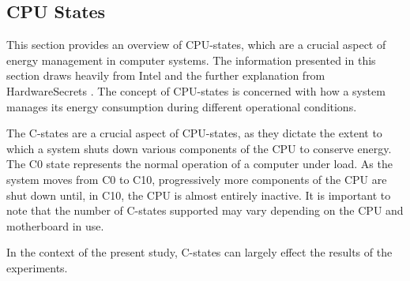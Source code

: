 \subsection{CPU States}\label{subsec:cpustates}

This section provides an overview of CPU-states, which are a crucial aspect of energy management in computer systems. The information presented in this section draws heavily from Intel \cite{CIntel} and the further explanation from HardwareSecrets \cite{CHard}. The concept of CPU-states is concerned with how a system manages its energy consumption during different operational conditions.

The C-states are a crucial aspect of CPU-states, as they dictate the extent to which a system shuts down various components of the CPU to conserve energy. The C0 state represents the normal operation of a computer under load. As the system moves from C0 to C10, progressively more components of the CPU are shut down until, in C10, the CPU is almost entirely inactive. It is important to note that the number of C-states supported may vary depending on the CPU and motherboard in use.




In the context of the present study, C-states can largely effect the results of the experiments.
